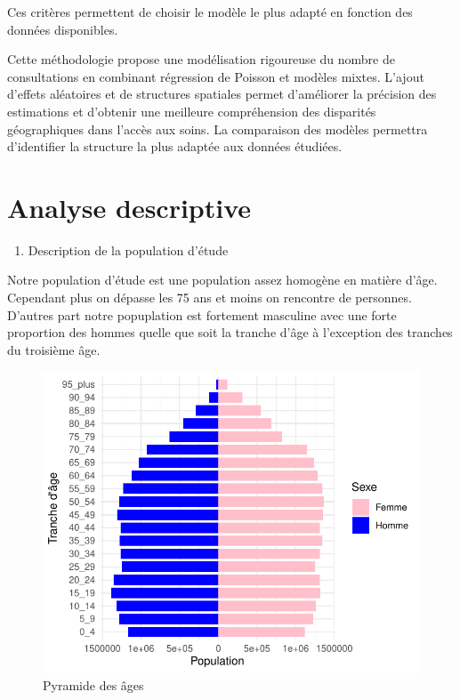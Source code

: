 \documentclass[
]{article}
\providecommand{\tightlist}{%
  \setlength{\itemsep}{0pt}\setlength{\parskip}{0pt}}
\begin{document}
Ces critères permettent de choisir le modèle le plus adapté en fonction
des données disponibles.

Cette méthodologie propose une modélisation rigoureuse du nombre de
consultations en combinant régression de Poisson et modèles mixtes.
L'ajout d'effets aléatoires et de structures spatiales permet
d'améliorer la précision des estimations et d'obtenir une meilleure
compréhension des disparités géographiques dans l'accès aux soins. La
comparaison des modèles permettra d'identifier la structure la plus
adaptée aux données étudiées.

\hypertarget{analyse-descriptive}{%
\section{Analyse descriptive}\label{analyse-descriptive}}

\begin{enumerate}
\def\labelenumi{\arabic{enumi}.}
\tightlist
\item
  Description de la population d'étude
\end{enumerate}

Notre population d'étude est une population assez homogène en matière
d'âge. Cependant plus on dépasse les 75 ans et moins on rencontre de
personnes. D'autres part notre popuplation est fortement masculine avec
une forte proportion des hommes quelle que soit la tranche d'âge à
l'exception des tranches du troisième âge.

\begin{figure}

{\centering \includegraphics{rapport_intermediaire_files/figure-latex/unnamed-chunk-8-1} 

}

\caption{Pyramide des âges}\label{fig:unnamed-chunk-8}
\end{figure}
\end{document}
